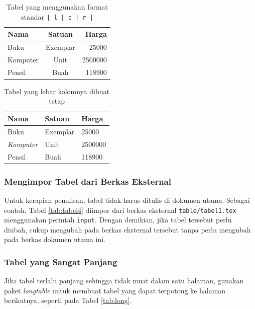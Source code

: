 \begin{table}[t]
  \caption{Tabel yang menggunakan format standar \texttt{| l | c | r |}}
  \label{tab:tabel2}
	\begin{tabular}{ | l | c | r | }
	\hline
	Nama 	& Satuan 		& Harga \\
	\hline
	Buku 	& Exemplar	& 25000 \\
	Komputer	& Unit		& 2500000 \\
	Pensil	& Buah		& 118900 \\
	\hline
	\end{tabular}
\end{table}

\begin{table}[t]
  \centering
  \caption{Tabel yang lebar kolomnya dibuat tetap}
  \label{tbl:tabel3}
	\begin{tabular}{  p{} | p{} | p{}  }
	\hline
	\textbf{Nama} 	& \textbf{Satuan} 		& \textbf{Harga} \\
	\hline
	Buku 	& Exemplar	& 25000 \\
	\emph{Komputer}	& Unit		& 2500000 \\
	Pensil	& Buah		& 118900 \\
	\hline
	\end{tabular}
\end{table}

\subsubsection{Mengimpor Tabel dari Berkas Eksternal}

Untuk kerapian penulisan, tabel tidak harus ditulis di dokumen utama. Sebagai contoh, Tabel \ref{tab:tabel4} diimpor dari berkas eksternal \texttt{table/tabel1.tex} menggunakan perintah \texttt{input}.
Dengan demikian, jika tabel tersebut perlu diubah, cukup mengubah pada berkas eksternal tersebut tanpa perlu mengubah pada berkas dokumen utama ini.



\subsubsection{Tabel yang Sangat Panjang}
Jika tabel terlalu panjang sehingga tidak muat dalam satu halaman, gunakan paket
\textit{longtable} untuk membuat tabel yang dapat terpotong ke halaman berikutnya,
seperti pada Tabel \ref{tab:long}.



